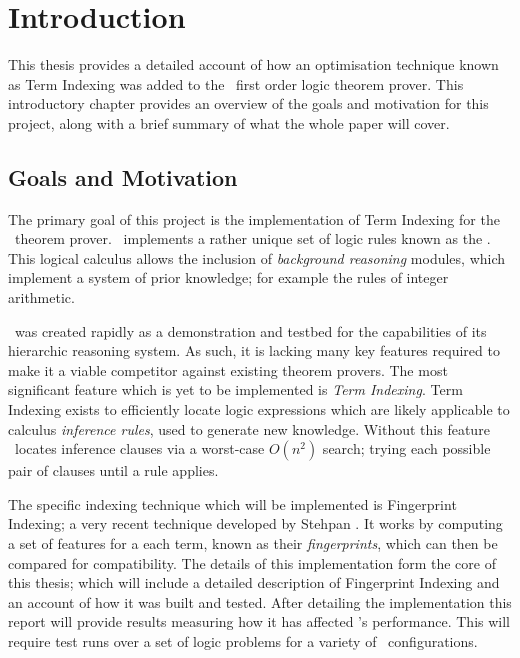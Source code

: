 
\chapter{Introduction}
\label{cha:intro}

This thesis provides a detailed account of how an optimisation technique known
as Term Indexing was added to the \beagle\ first order logic theorem prover. This
introductory chapter provides an overview of the goals and motivation for this project,
along with a brief summary of what the whole paper will cover.

\section{Goals and Motivation}
\label{sec:mot}

The primary goal of this project is the implementation of Term Indexing
for the \beagle\ theorem prover. \Beagle\ implements a rather unique set of logic rules known as the \emph{\HSWAC} \cite{baum13}.
This logical calculus allows the inclusion of \emph{background reasoning} modules,
which implement a system of prior knowledge; for example the rules of integer arithmetic.

\Beagle\ was created rapidly as a demonstration and testbed for the capabilities
of its hierarchic reasoning system. As such, it is lacking many key features required
to make it a viable competitor against existing theorem provers. The most significant
feature which is yet to be implemented is \emph{Term Indexing}. Term Indexing exists
to efficiently locate logic expressions which are likely applicable to calculus \emph{inference rules},
used to generate new knowledge. Without this feature \beagle\ locates inference clauses
via a worst-case $O(n^2)$ search; trying each possible pair of clauses until a rule applies.

The specific indexing technique which will be implemented is Fingerprint Indexing;
a very recent technique developed by Stehpan . It works by computing
a set of features for a each term, known as their \emph{fingerprints}, which can then
be compared for compatibility. The details of this implementation form the core
of this thesis; which will include a detailed description of Fingerprint Indexing
and an account of how it was built and tested.
After detailing the implementation this report will provide results measuring
how it has affected \beagle's performance. This will require test runs over a set
of logic problems for a variety of \beagle\ configurations.

